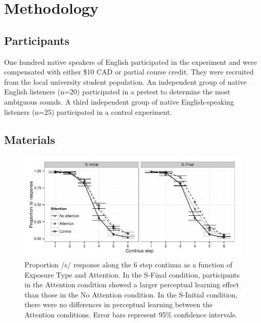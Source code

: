 \documentclass[a4paper,11pt,twocolumn]{article}
\begin{document}
\section{Methodology}

\subsection{Participants}

One hundred native speakers of English participated in the experiment and were compensated with either \$10 CAD or partial course credit. They were recruited from the local university student population. An independent group of native English listeners  (n=20) participated in a pretest to determine the most ambiguous sounds. A third independent group of native English-speaking listeners (n=25) participated in a control experiment.

\subsection{Materials}

\begin{figure}[!ht]
\caption{Proportion /s/ response along the 6 step continua as a function of Exposure Type and Attention.    In the S-Final condition, participants in the Attention condition showed a larger perceptual learning effect than those in the No Attention condition.  In the S-Initial condition, there were no differences in perceptual learning between the Attention conditions. Error bars represent 95\% confidence intervals.}\label{fig:categ}
\begin{center}
\includegraphics[width=\textwidth]{categresults}
\end{center}
\end{figure}
\end{document}
